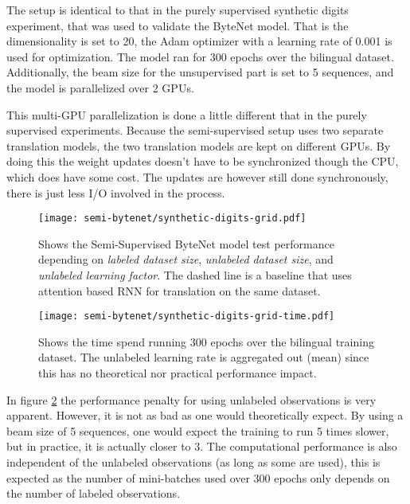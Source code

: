 The setup is identical to that in the purely supervised synthetic digits experiment, that was used to validate the ByteNet model. That is the dimensionality is set to 20, the Adam optimizer with a learning rate of 0.001 is used for optimization. The model ran for 300 epochs over the bilingual dataset. Additionally, the beam size for the unsupervised part is set to 5 sequences, and the model is parallelized over 2 GPUs.

This multi-GPU parallelization is done a little different that in the purely supervised experiments. Because the semi-supervised setup uses two separate translation models, the two translation models are kept on different GPUs. By doing this the weight updates doesn't have to be synchronized though the CPU, which does have some cost. The updates are however still done synchronously, there is just less I/O involved in the process.

\begin{figure}[h]
    \centering
    \texttt{[image: semi-bytenet/synthetic-digits-grid.pdf]}
    \caption{Shows the Semi-Supervised ByteNet model test performance depending on \textit{labeled dataset size}, \textit{unlabeled dataset size}, and \textit{unlabeled learning factor}. The dashed line is a baseline that uses attention based RNN for translation on the same dataset.}
     \label{fig:result:semi-bytenet:missrate}
\end{figure}

\begin{figure}[h]
    \centering
    \texttt{[image: semi-bytenet/synthetic-digits-grid-time.pdf]}
    \caption{Shows the time spend running 300 epochs over the bilingual training dataset. The unlabeled learning rate is aggregated out (mean) since this has no theoretical nor practical performance impact.}
    \label{fig:result:semi-bytenet:time}
\end{figure}

In figure \ref{fig:result:semi-bytenet:time} the performance penalty for using unlabeled observations is very apparent. However, it is not as bad as one would theoretically expect. By using a beam size of 5 sequences, one would expect the training to run 5 times slower, but in practice, it is actually closer to 3. The computational performance is also independent of the unlabeled observations (as long as some are used), this is expected as the number of mini-batches used over 300 epochs only depends on the number of labeled observations.

